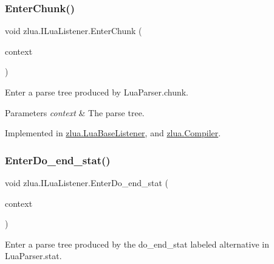 \subsubsection{\texorpdfstring{Enter\+Chunk()}{EnterChunk()}}
{\footnotesize\ttfamily void zlua.\+I\+Lua\+Listener.\+Enter\+Chunk (\begin{DoxyParamCaption}\item[{\mbox{[}\+Not\+Null\mbox{]} \mbox{\hyperlink{classzlua_1_1_lua_parser_1_1_chunk_context}{Lua\+Parser.\+Chunk\+Context}}}]{context }\end{DoxyParamCaption})}



Enter a parse tree produced by Lua\+Parser.\+chunk. 


\begin{DoxyParams}{Parameters}
{\em context} & The parse tree.\\
\hline
\end{DoxyParams}


Implemented in \mbox{\hyperlink{classzlua_1_1_lua_base_listener_a441cbddff1cc031c9eec17003ddff72f}{zlua.\+Lua\+Base\+Listener}}, and \mbox{\hyperlink{classzlua_1_1_compiler_ac52a396b2bba3e5b8767672a72593d79}{zlua.\+Compiler}}.

\mbox{\label{interfacezlua_1_1_i_lua_listener_ad561e0f5feb33ca80ba5202ab0511bab}} 
\subsubsection{\texorpdfstring{Enter\+Do\+\_\+end\+\_\+stat()}{EnterDo\_end\_stat()}}
{\footnotesize\ttfamily void zlua.\+I\+Lua\+Listener.\+Enter\+Do\+\_\+end\+\_\+stat (\begin{DoxyParamCaption}\item[{\mbox{[}\+Not\+Null\mbox{]} \mbox{\hyperlink{classzlua_1_1_lua_parser_1_1_do__end__stat_context}{Lua\+Parser.\+Do\+\_\+end\+\_\+stat\+Context}}}]{context }\end{DoxyParamCaption})}



Enter a parse tree produced by the {\ttfamily do\+\_\+end\+\_\+stat} labeled alternative in Lua\+Parser.\+stat. 



